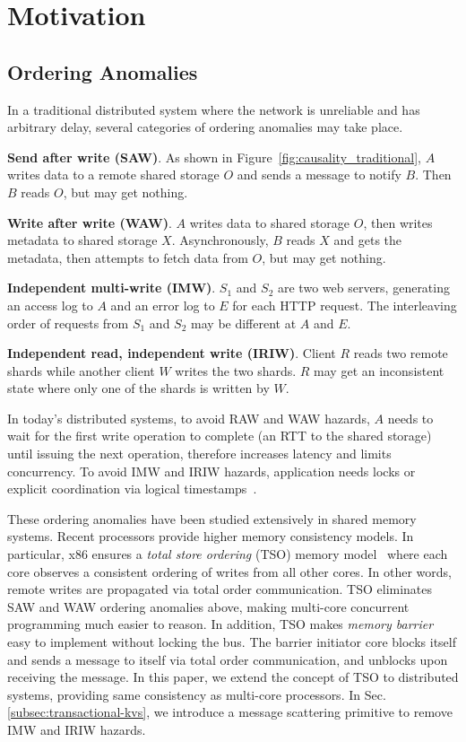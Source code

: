 \section{Motivation}
\label{sec:motivation}

\subsection{Ordering Anomalies}
\label{subsec:tso}

In a traditional distributed system where the network is unreliable and has arbitrary delay, several categories of ordering anomalies may take place.

\textbf{Send after write (SAW)}. As shown in Figure~\ref{fig:causality_traditional}, $A$ writes data to a remote shared storage $O$ and sends a message to notify $B$. Then $B$ reads $O$, but may get nothing.

\textbf{Write after write (WAW)}. $A$ writes data to shared storage $O$, then writes metadata to shared storage $X$. Asynchronously, $B$ reads $X$ and gets the metadata, then attempts to fetch data from $O$, but may get nothing.

\textbf{Independent multi-write (IMW)}. $S_1$ and $S_2$ are two web servers, generating an access log to $A$ and an error log to $E$ for each HTTP request. The interleaving order of requests from $S_1$ and $S_2$ may be different at $A$ and $E$.

\textbf{Independent read, independent write (IRIW)}. Client $R$ reads two remote shards while another client $W$ writes the two shards. $R$ may get an inconsistent state where only one of the shards is written by $W$.


In today's distributed systems, to avoid RAW and WAW hazards, $A$ needs to wait for the first write operation to complete (an RTT to the shared storage) until issuing the next operation, therefore increases latency and limits concurrency. To avoid IMW and IRIW hazards, application needs locks or explicit coordination via logical timestamps~\cite{lamport1978time}.

These ordering anomalies have been studied extensively in shared memory systems. Recent processors provide higher memory consistency models. In particular, x86 ensures a \textit{total store ordering} (TSO) memory model~\cite{sewell2010x86} where each core observes a consistent ordering of writes from all other cores. In other words, remote writes are propagated via total order communication. TSO eliminates SAW and WAW ordering anomalies above, making multi-core concurrent programming much easier to reason. In addition, TSO makes \textit{memory barrier} easy to implement without locking the bus. The barrier initiator core blocks itself and sends a message to itself via total order communication, and unblocks upon receiving the message. In this paper, we extend the concept of TSO to distributed systems, providing same consistency as multi-core processors. In Sec.\ref{subsec:transactional-kvs}, we introduce a message scattering primitive to remove IMW and IRIW hazards. %

